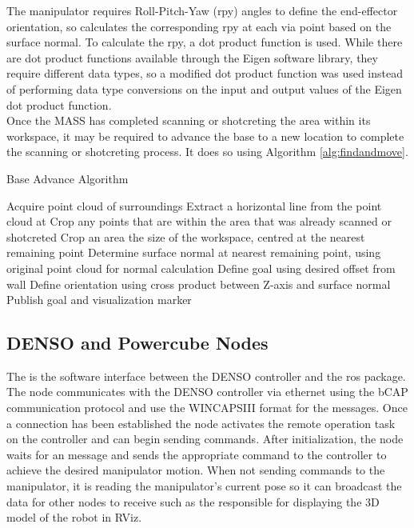 The manipulator requires Roll-Pitch-Yaw (\acrshort{rpy}) angles to define the end-effector orientation, so  calculates the corresponding \acrshort{rpy} at each via point based on the surface normal. To calculate the \acrshort{rpy}, a dot product function is used. While there are dot product functions available through the Eigen software library, they require different data types, so a modified dot product function was used instead of performing data type conversions on the input and output values of the Eigen dot product function.\\

Once the MASS has completed scanning or shotcreting the area within its workspace, it may be required to advance the base to a new location to complete the scanning or shotcreting process. It does so using Algorithm \ref{alg:findandmove}.

\begin{algorithm}[H]
\caption{Base Advance Algorithm}
\label{alg:findandmove}
\begin{algorithmic}[1]
\State Acquire point cloud of surroundings
\State Extract a horizontal line from the point cloud at 
\State Crop any points that are within the area that was already scanned or shotcreted
\State Crop an area the size of the workspace, centred at the nearest remaining point
\State Determine surface normal at nearest remaining point, using original point cloud for normal calculation
\State Define  goal using desired offset from wall
\State Define  orientation using cross product between Z-axis and surface normal
\State Publish  goal and visualization marker
\end{algorithmic}
\end{algorithm}

\subsection{DENSO and Powercube Nodes}
The  is the software interface between the DENSO controller and the \acrshort{ros} package. The node communicates with the DENSO controller via ethernet using the bCAP communication protocol and use the WINCAPSIII format for the messages. Once a connection has been established the node activates the remote operation task on the controller and can begin sending commands. After initialization, the node waits for an  message and sends the appropriate command to the controller to achieve the desired manipulator motion. When not sending commands to the manipulator, it is reading the manipulator's current pose so it can broadcast the data for other nodes to receive such as the  responsible for displaying the 3D model of the robot in RViz.\\


